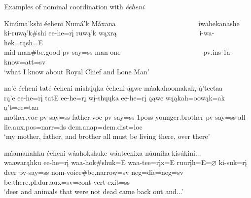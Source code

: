 \newpage

\begin{exe}

\item\label{ExNounCoord2} Examples of nominal coordination with \textit{éeheni}



\begin{xlist}
\item\label{ExNounCoord2A} \glll Kinúma'kshi éeheni Numá'k Máxana ~ ~ ~ ~ ~ ~ ~ ~ ~ ~ ~ ~ ~ ~ íwahekanashe\\
ki-ruwą'k\#shi ee-he=rį ruwą'k wąxrą ~ ~ ~ ~ ~ ~ ~ ~ ~ ~ ~ ~ ~ ~ i-wa-hek=rąsh=E\\
mid-\textnormal{man}\#\textnormal{be.good} pv-\textnormal{say}=ss \textnormal{man} \textnormal{one} ~ ~ ~ ~ ~ ~ ~ ~ ~ ~ ~ ~ ~ ~ pv.ins-1a-\textnormal{know}=att=sv\\
\glt `what I know about Royal Chief and Lone Man' \citep[1]{hollow1973a}

\item\label{ExNounCoord2B} \glll na'é éeheni taté éeheni mishų́ųka éeheni ą́ąwe máakahoomakak, ą́'teetaa\\
rą'e ee-he=rį tatE ee-he=rį wį-shųųka ee-he=rį ąąwe wąąkah=oowąk=ak ą't=ee=taa\\
\textnormal{mother}.voc pv-\textnormal{say}=ss \textnormal{father}.voc pv-\textnormal{say}=ss 1poss-\textnormal{younger.brother} pv-\textnormal{say}=ss \textnormal{all} \textnormal{lie}.aux.pos=narr=ds dem.anap=dem.dist=loc\\
\glt `my mother, father, and brother all must be living there, over there' \citep[77]{hollow1973a}

\item\label{ExNounCoord2C} \glll máamanahku éeheni wáahokshuke wáateenixa núuniha kisúkini...\\
waawarąhku ee-he=rį waa-hok\#shuk=E waa-tee=rįx=E ruurįh=E=$\varnothing$ ki-suk=rį\\
\textnormal{deer} pv-\textnormal{say}=ss nom-\textnormal{voice}\#\textnormal{be.narrow}=sv neg=\textnormal{die}=neg=sv \textnormal{be.there}.pl.dur.aux=sv=cont vert-\textnormal{exit}=ss\\
\glt `deer and animals that were not dead came back out and...' \citep[150]{hollow1973a}

\end{xlist}
    
\end{exe}

